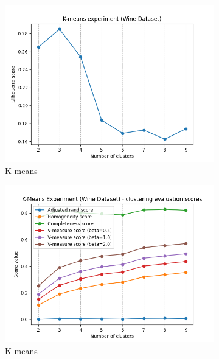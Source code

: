 \documentclass[12pt]{article}
\begin{document}
\begin{figure}[H]
    \centering
    \begin{subfigure}[t]{0.19\textwidth}
        \includegraphics[width=\linewidth]{img/other_datasets/wine_kmeans_silhouette.png}
        \caption{K-means}
    \end{subfigure}
    \hfill
    \begin{subfigure}[t]{0.19\textwidth}
        \includegraphics[width=\linewidth]{img/other_datasets/wine_kmeans_scores.png}
        \caption{K-means}
    \end{subfigure}
    \hfill
    \begin{subfigure}[t]{0.19\textwidth}

\end{subfigure}
\end{figure}
\end{document}
